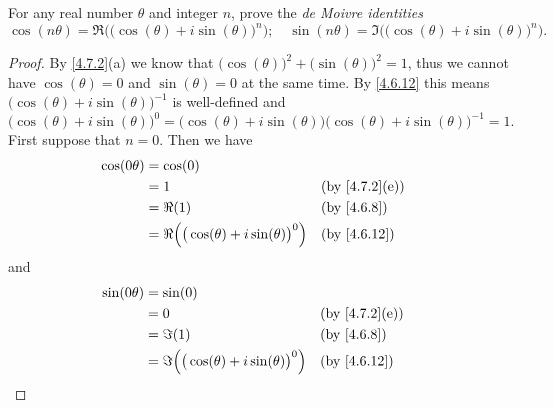 \begin{ex}\label{ex:4.7.7}
  For any real number \(\theta\) and integer \(n\), prove the \emph{de Moivre identities}
  \[
    \cos(n \theta) = \Re\Big(\big(\cos(\theta) + i \sin(\theta)\big)^n\Big); \quad \sin(n \theta) = \Im\Big(\big(\cos(\theta) + i \sin(\theta)\big)^n\Big).
  \]
\end{ex}

\begin{proof}
  By \cref{4.7.2}(a) we know that \(\big(\cos(\theta)\big)^2 + \big(\sin(\theta)\big)^2 = 1\), thus we cannot have \(\cos(\theta) = 0\) and \(\sin(\theta) = 0\) at the same time.
  By \cref{4.6.12} this means \(\big(\cos(\theta) + i \sin(\theta)\big)^{-1}\) is well-defined and
  \[
    \big(\cos(\theta) + i \sin(\theta)\big)^0 = \big(\cos(\theta) + i \sin(\theta)\big) \big(\cos(\theta) + i \sin(\theta)\big)^{-1} = 1.
  \]
  First suppose that \(n = 0\).
  Then we have
  \begin{align*}
    \cos(0 \theta) & = \cos(0)                                                                                 \\
                   & = 1                                                      &  & \text{(by \cref{4.7.2}(e))} \\
                   & = \Re(1)                                                 &  & \by{4.6.8}                  \\
                   & = \Re\Big(\big(\cos(\theta) + i \sin(\theta)\big)^0\Big) &  & \by{4.6.12}
  \end{align*}
  and
  \begin{align*}
    \sin(0 \theta) & = \sin(0)                                                                                 \\
                   & = 0                                                      &  & \text{(by \cref{4.7.2}(e))} \\
                   & = \Im(1)                                                 &  & \by{4.6.8}                  \\
                   & = \Im\Big(\big(\cos(\theta) + i \sin(\theta)\big)^0\Big) &  & \by{4.6.12}
  \end{align*}


\end{proof}
